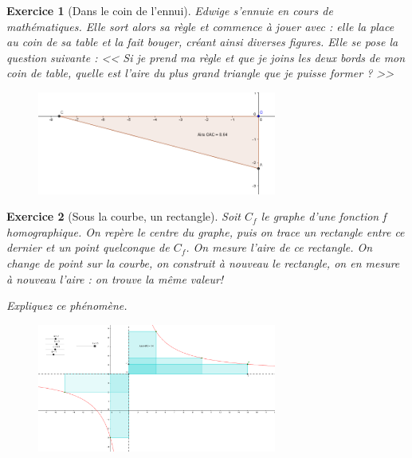 \documentclass[12pt]{article}
\theoremstyle{break}
\newtheorem{exo}{Exercice}
\begin{document}
\begin{exo}[Dans le coin de l'ennui]
Edwige s'ennuie en cours de mathématiques. Elle sort alors sa règle et commence à jouer avec : elle la place au coin de sa table et la fait bouger, créant ainsi diverses figures. Elle se pose la question suivante : << Si je prend ma règle et que je joins les deux bords de mon coin de table, quelle est l'aire du plus grand triangle que je puisse former ? >>

\begin{figure}[h!]
	\centering
    \includegraphics[width=0.7\textwidth]{TriangleCoinDeTable.png}
    
\end{figure}
\end{exo}


\begin{exo}[Sous la courbe, un rectangle]
Soit $C_f$ le graphe d'une fonction f homographique. On repère le centre du graphe, puis on trace un rectangle entre ce dernier et un point quelconque de $C_f$. On mesure l'aire de ce rectangle. On change de point sur la courbe, on construit à nouveau le rectangle, on en mesure à nouveau l'aire : on trouve la même valeur!

Expliquez ce phénomène.

\begin{figure}[h!]
	\centering
    \includegraphics[width=0.7\textwidth]{RectangleHomographique.png}
    
\end{figure}
\end{exo}
\end{document}
